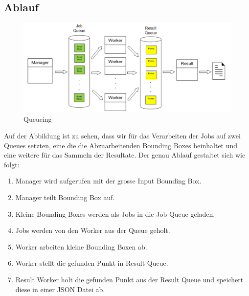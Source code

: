 \subsection{Ablauf}
\label{subsec:ablauf}
\begin{figure}[H]
\includegraphics[width=\textwidth]{images/queuing.png}
\caption[Queueing]{Queueing}
\end{figure}
Auf der Abbildung ist zu sehen, dass wir für das Verarbeiten der Jobs auf zwei Queues setzten, eine die die Abzuarbeitenden Bounding Boxes beinhaltet und eine weitere für das Sammeln der Resultate. Der genau Ablauf gestaltet sich wie folgt:
\begin{enumerate}
		\item Manager wird aufgerufen mit der grosse Input Bounding Box.
		\item Manager teilt Bounding Box auf.
		\item Kleine Bounding Boxes werden als Jobs in die Job Queue geladen.
		\item Jobs werden von den Worker aus der Queue geholt.
		\item Worker arbeiten kleine Bounding Boxen ab.
		\item Worker stellt die gefunden Punkt in Result Queue.
		\item Result Worker holt die gefunden Punkt aus der Result Queue und speichert diese in einer JSON Datei ab. 
\end{enumerate}









